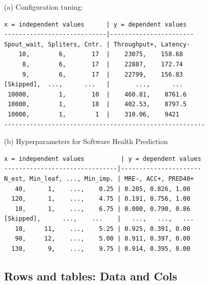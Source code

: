\documentclass[AMA,STIX2COL]{WileyNJDv5}
\newcommand{\cls}[1]{%
  \setlength{\fboxsep}{1.5pt}%
  \colorbox{clsbg}{\sffamily\bfseries{#1}}%
}
\begin{document}
\begin{table}[!b]
\caption{An example MOOT data set: configuration tuning for a
distributed stream-processing system. Numeric column names
start with an upper-case letter. Goal column names end with
``+'' (maximize) or ``-'' (minimize). Everything else is an
independent attribute.}
\label{moot}
\begin{center}
\begin{minipage}{3in}
\normalsize{(a) Configuration tuning:}
{\fontsize{6pt}{7.2pt}\selectfont
\begin{verbatim}
x = independent values      | y = dependent values
----------------------------|-----------------------
Spout_wait, Spliters, Cntr. | Throughput+, Latency-
    10,        6,       17  |    23075,    158.68
     8,        6,       17  |    22887,    172.74
     9,        6,       17  |    22799,    156.83
[Skipped],  ...,      ...   |       ...,      ...
 10000,        1,       10  |    460.81,    8761.6
 10000,        1,       18  |    402.53,    8797.5
 10000,        1,        1  |    310.06,    9421
-------------------------------------------------------
\end{verbatim}
}
\normalsize{(b) Hyperparameters for Software Health Prediction}
{\fontsize{6pt}{7.2pt}\selectfont
\begin{verbatim}
x = independent values          | y = dependent values
-------------------------------|----------------------
N_est, Min_leaf, ..., Min_imp. | MRE-, ACC+, PRED40+
   40,      1,    ...,    0.25 | 0.205, 0.826, 1.00
  120,      1,    ...,    4.75 | 0.191, 0.756, 1.00
   10,      1,    ...,    6.75 | 0.000, 0.790, 0.86
[Skipped],      ...,    ...    |   ...,   ...,   ...
   10,     11,    ...,    5.25 | 0.925, 0.391, 0.00
   90,     12,    ...,    5.00 | 0.911, 0.397, 0.00
  130,      9,    ...,    9.75 | 0.914, 0.395, 0.00
\end{verbatim}
}
\end{minipage}
\end{center}
\end{table}

\subsection{Rows and tables: \cls{Data} and \cls{Cols}}
\end{document}
